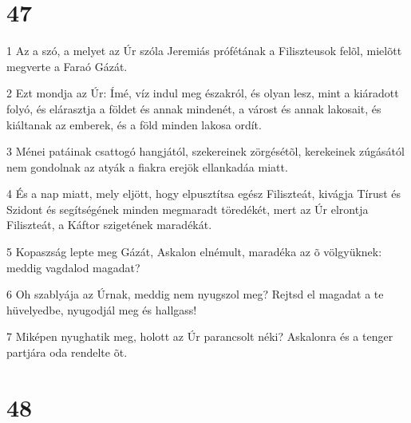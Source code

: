 \chapter{47}

\par 1 Az a szó, a melyet az Úr szóla Jeremiás prófétának a Filiszteusok felõl, mielõtt megverte a Faraó Gázát.
\par 2 Ezt mondja az Úr: Ímé, víz indul meg északról, és olyan lesz, mint a kiáradott folyó, és elárasztja a földet és annak mindenét, a várost és annak lakosait, és kiáltanak az emberek, és a föld minden lakosa ordít.
\par 3 Ménei patáinak csattogó hangjától, szekereinek zörgésétõl, kerekeinek zúgásától nem gondolnak az atyák a fiakra erejök ellankadáa miatt.
\par 4 És a nap miatt, mely eljött, hogy elpusztítsa egész Filiszteát, kivágja Tírust és Szidont és segítségének minden megmaradt töredékét, mert az Úr elrontja Filiszteát, a Káftor szigetének maradékát.
\par 5 Kopaszság lepte meg Gázát, Askalon elnémult, maradéka az õ völgyüknek: meddig vagdalod magadat?
\par 6 Oh szablyája az Úrnak, meddig nem nyugszol meg? Rejtsd el magadat a te hüvelyedbe, nyugodjál meg és hallgass!
\par 7 Miképen nyughatik meg, holott az Úr parancsolt néki? Askalonra és a tenger partjára oda rendelte õt.

\chapter{48}


